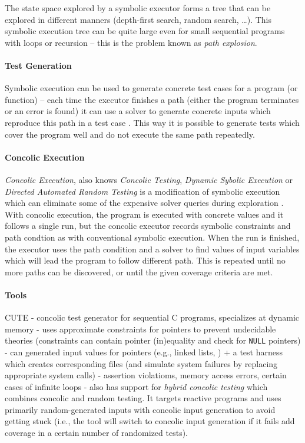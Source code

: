 The state space explored by a symbolic executor forms a tree that can be explored in different manners (depth-first search, random search, …).
This symbolic execution tree can be quite large even for small sequential programs with loops or recursion -- this is the problem known as \emph{path explosion}.

\paragraph{Test Generation}

Symbolic execution can be used to generate concrete test cases for a program (or function) -- each time the executor finishes a path (either the program terminates or an error is found) it can use a solver to generate concrete inputs which reproduce this path in a test case .
This way it is possible to generate tests which cover the program well and do not execute the same path repeatedly.

\paragraph{Concolic Execution}

\emph{Concolic Execution}, also knows \emph{Concolic Testing}, \emph{Dynamic Sybolic Execution} or \emph{Directed Automated Random Testing} is a modification of symbolic execution which can eliminate some of the expensive solver queries during exploration .
With concolic execution, the program is executed with concrete values and it follows a single run, but the concolic executor records symbolic constraints and path condtion as with conventional symbolic execution.
When the run is finished, the executor uses the path condition and a solver to find values of input variables which will lead the program to follow different path.
This is repeated until no more paths can be discovered, or until the given coverage criteria are met.

\paragraph{Tools}

CUTE 
- concolic test generator for sequential C programs, specializes at dynamic memory
- uses approximate constraints for pointers to prevent undecidable theories (constraints can contain pointer (in)equality and check for \texttt{NULL} pointers)
- can generated input values for pointers (e.g., linked lists, ) + a test harness which creates corresponding files (and simulate system failures by replacing appropriate system calls)
- assertion violatioms, memory access errors, certain cases of infinite loops
- also has support for \emph{hybrid concolic testing} which combines concolic and random testing. It targets reactive programs and uses primarily random-generated inputs with concolic input generation to avoid getting stuck (i.e., the tool will switch to concolic input generation if it fails add coverage in a certain number of randomized tests).

